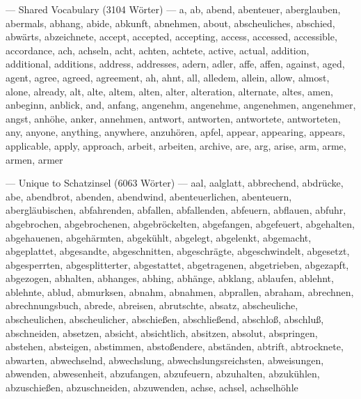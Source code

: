 \documentclass{scrartcl}
\begin{document}
--- Shared Vocabulary (3104 Wörter) ---
a, ab, abend, abenteuer, aberglauben, abermals, abhang, abide, abkunft, abnehmen, about, abscheuliches, abschied, abwärts, abzeichnete, accept, accepted, accepting, access, accessed, accessible, accordance, ach, achseln, acht, achten, achtete, active, actual, addition, additional, additions, address, addresses, adern, adler, affe, affen, against, aged, agent, agree, agreed, agreement, ah, ahnt, all, alledem, allein, allow, almost, alone, already, alt, alte, altem, alten, alter, alteration, alternate, altes, amen, anbeginn, anblick, and, anfang, angenehm, angenehme, angenehmen, angenehmer, angst, anhöhe, anker, annehmen, antwort, antworten, antwortete, antworteten, any, anyone, anything, anywhere, anzuhören, apfel, appear, appearing, appears, applicable, apply, approach, arbeit, arbeiten, archive, are, arg, arise, arm, arme, armen, armer

--- Unique to Schatzinsel (6063 Wörter) ---
aal, aalglatt, abbrechend, abdrücke, abe, abendbrot, abenden, abendwind, abenteuerlichen, abenteuern, abergläubischen, abfahrenden, abfallen, abfallenden, abfeuern, abflauen, abfuhr, abgebrochen, abgebrochenen, abgebröckelten, abgefangen, abgefeuert, abgehalten, abgehauenen, abgehärmten, abgekühlt, abgelegt, abgelenkt, abgemacht, abgeplattet, abgesandte, abgeschnitten, abgeschrägte, abgeschwindelt, abgesetzt, abgesperrten, abgesplitterter, abgestattet, abgetragenen, abgetrieben, abgezapft, abgezogen, abhalten, abhanges, abhing, abhänge, abklang, ablaufen, ablehnt, ablehnte, ablud, abmurksen, abnahm, abnahmen, abprallen, abraham, abrechnen, abrechnungsbuch, abrede, abreisen, abrutschte, absatz, abscheuliche, abscheulichen, abscheulicher, abschießen, abschließend, abschloß, abschluß, abschneiden, absetzen, absicht, absichtlich, absitzen, absolut, abspringen, abstehen, absteigen, abstimmen, abstoßendere, abständen, abtrift, abtrocknete, abwarten, abwechselnd, abwechslung, abwechslungsreichsten, abweisungen, abwenden, abwesenheit, abzufangen, abzufeuern, abzuhalten, abzukühlen, abzuschießen, abzuschneiden, abzuwenden, achse, achsel, achselhöhle
\end{document}
